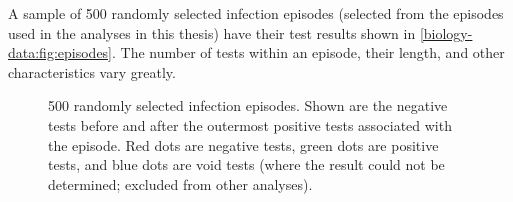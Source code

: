 \documentclass[thesis.tex]{subfiles}
\begin{document}
A sample of 500 randomly selected infection episodes (selected from the episodes used in the analyses in this thesis) have their test results shown in \cref{biology-data:fig:episodes}.
The number of tests within an episode, their length, and other characteristics vary greatly.
\begin{figure}
  \vspace{-5cm}
  \caption[CIS infection episodes]{%
    500 randomly selected infection episodes.
    Shown are the negative tests before and after the outermost positive tests associated with the episode.
    Red dots are negative tests, green dots are positive tests, and blue dots are void tests (where the result could not be determined; excluded from other analyses).
  }
\end{figure}
\end{document}
